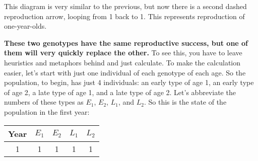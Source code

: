 \documentclass[10pt,reqno]{amsbook}
\numberwithin{equation}{chapter}
\newcommand{\noi}{\noindent}
\begin{document}
\noi This diagram is very similar to the previous, but now there is a second dashed reproduction arrow, looping from 1 back to 1. This represents reproduction of one-year-olds. 

\textbf{These two genotypes have the same reproductive success, but one of them will very quickly replace the other.} 
To see this, you have to leave heuristics and metaphors behind and just calculate. To make the calculation easier, let's start with just one individual of each genotype of each age. So the population, to begin, has just 4 individuals: an early type of age 1, an early type of age 2, a late type of age 1, and a late type of age 2. Let's abbreviate the numbers of these types as $E_1$, $E_2$, $L_1$, and $L_2$. So this is the state of the population in the first year:
\begin{center}
\begin{tabular}{ccccc}
Year & $E_1$ & $E_2$ & $L_1$ & $L_2$\\
\hline
1 & 1 & 1 & 1 & 1
\end{tabular}
\end{center}
\end{document}

